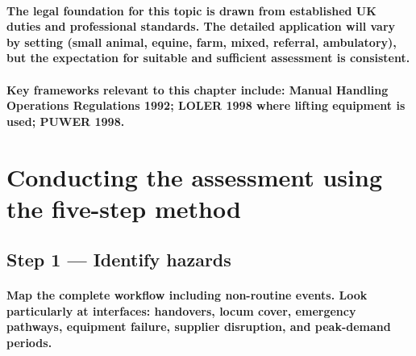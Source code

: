 \paragraph{The legal foundation for this topic is drawn from established UK duties and professional standards. The detailed application will vary by setting (small animal, equine, farm, mixed, referral, ambulatory), but the expectation for suitable and sufficient assessment is consistent.}

\paragraph{Key frameworks relevant to this chapter include: Manual Handling Operations Regulations 1992; LOLER 1998 where lifting equipment is used; PUWER 1998.}

\begin{itemize}
\end{itemize}

\section{Conducting the assessment using the five-step method}

\subsection{Step 1 — Identify hazards}
\paragraph{Map the complete workflow including non-routine events. Look particularly at interfaces: handovers, locum cover, emergency pathways, equipment failure, supplier disruption, and peak-demand periods.}

